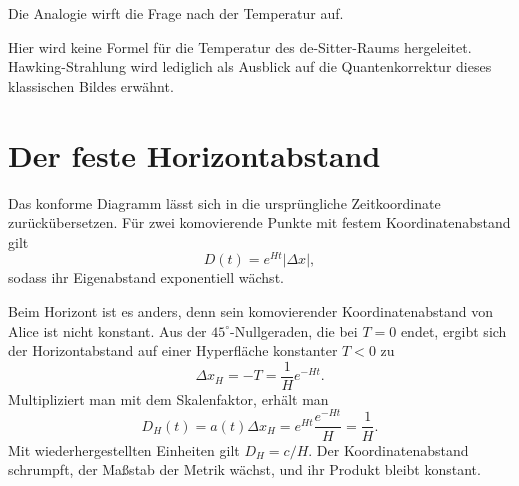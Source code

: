 Die Analogie wirft die Frage nach der Temperatur auf.

\begin{classroomqa}
\end{classroomqa}

Hier wird keine Formel für die Temperatur des de-Sitter-Raums hergeleitet. Hawking-Strahlung wird lediglich als Ausblick auf die Quantenkorrektur dieses klassischen Bildes erwähnt.

\section{Der feste Horizontabstand}

Das konforme Diagramm lässt sich in die ursprüngliche Zeitkoordinate zurückübersetzen. Für zwei komovierende Punkte mit festem Koordinatenabstand gilt
\begin{equation}
D(t)=e^{Ht}\lvert\Delta x\rvert,
\end{equation}
sodass ihr Eigenabstand exponentiell wächst.

\begin{classroomqa}
\end{classroomqa}

Beim Horizont ist es anders, denn sein komovierender Koordinatenabstand von Alice ist nicht konstant. Aus der \(45^\circ\)-Nullgeraden, die bei \(T=0\) endet, ergibt sich der Horizontabstand auf einer Hyperfläche konstanter \(T<0\) zu
\begin{equation}
\Delta x_H=-T=\frac{1}{H}e^{-Ht}.
\label{eq:l08-coordinate-horizon}
\end{equation}
Multipliziert man mit dem Skalenfaktor, erhält man
\begin{equation}
D_H(t)=a(t)\Delta x_H
=e^{Ht}\frac{e^{-Ht}}{H}
=\frac{1}{H}.
\label{eq:l08-fixed-horizon}
\end{equation}
Mit wiederhergestellten Einheiten gilt \(D_H=c/H\). Der Koordinatenabstand schrumpft, der Maßstab der Metrik wächst, und ihr Produkt bleibt konstant.

